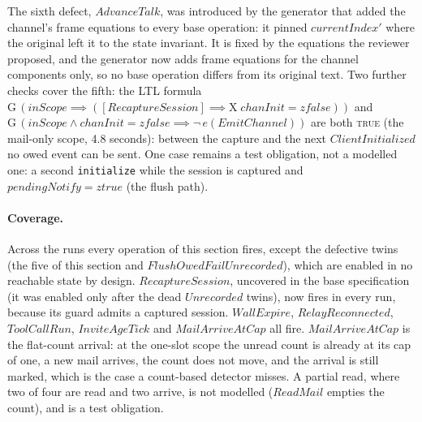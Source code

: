 \documentclass[a4paper,10pt,fleqn]{article}
\begin{document}
The sixth defect, $AdvanceTalk$, was introduced by the generator that added
the channel's frame equations to every base operation: it pinned
$currentIndex'$ where the original left it to the state invariant.  It is
fixed by the equations the reviewer proposed, and the generator now adds frame
equations for the channel components only, so no base operation differs from
its original text.  Two further checks cover the fifth: the LTL formula
$\mathrm{G}\,(\mathit{inScope} \implies ([RecaptureSession] \implies
\mathrm{X}\; chanInit = zfalse))$ and $\mathrm{G}\,(\mathit{inScope} \land
chanInit = zfalse \implies \lnot\, e(EmitChannel))$ are both \textsc{true} (the
mail-only scope, 4.8 seconds): between the capture and the next
$ClientInitialized$ no owed event can be sent.  One case remains a test
obligation, not a modelled one: a second \texttt{initialize} while the
session is captured and $pendingNotify = ztrue$ (the flush path).

\paragraph{Coverage.}  Across the runs every operation of this section
fires, except the defective twins (the five of this section and
$FlushOwedFailUnrecorded$), which are enabled in no reachable
state by design.  $RecaptureSession$, uncovered in the base specification
(it was enabled only after the dead $Unrecorded$ twins), now fires in every
run, because its guard admits a captured session.  $WallExpire$,
$RelayReconnected$, $ToolCallRun$, $InviteAgeTick$ and $MailArriveAtCap$ all
fire.  $MailArriveAtCap$ is the flat-count arrival: at the one-slot scope the
unread count is already at its cap of one, a new mail arrives, the count does
not move, and the arrival is still marked, which is the case a count-based
detector misses.  A partial read, where two of four are read and two arrive,
is not modelled ($ReadMail$ empties the count), and is a test obligation.
\end{document}
